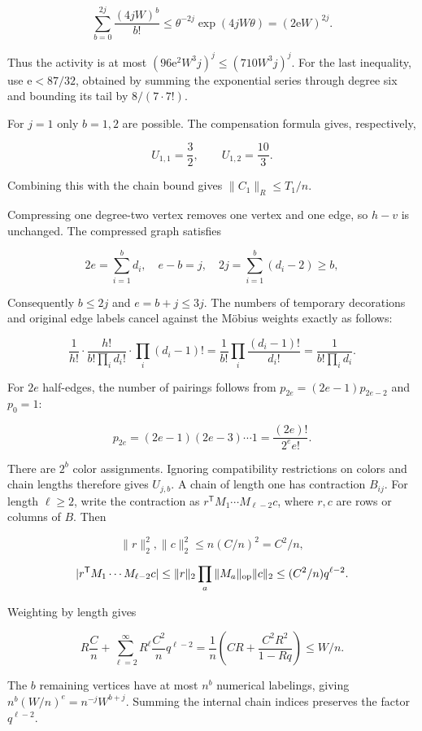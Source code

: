 \documentclass[11pt,a4paper]{article}
\begin{document}
\[
\sum_{b=0}^{2j}\frac{(4jW)^b}{b!}
\le\theta^{-2j}\exp(4jW\theta)
=(2\mathrm e W)^{2j}.
\]

Thus the activity is at most \((96\mathrm e^2W^3j)^j\le(710W^3j)^j\). For the last inequality, use \(\mathrm e<87/32\), obtained by summing the exponential series through degree six and bounding its tail by \(8/(7\cdot7!)\).

For \(j=1\) only \(b=1,2\) are possible. The compensation formula gives, respectively,

\[
U_{1,1}=\frac32,\qquad U_{1,2}=\frac{10}{3}.
\]

Combining this with the chain bound gives \(\|C_1\|_R\le T_1/n\).

Compressing one degree-two vertex removes one vertex and one edge, so \(h-v\) is unchanged. The compressed graph satisfies

\[
2e=\sum_{i=1}^bd_i,\quad e-b=j,\quad
2j=\sum_{i=1}^b(d_i-2)\ge b,
\]

Consequently \(b\le2j\) and \(e=b+j\le3j\). The numbers of temporary decorations and original edge labels cancel against the Möbius weights exactly as follows:

\[
\frac1{h!}\cdot\frac{h!}{b!\prod_i d_i!}\cdot\prod_i(d_i-1)!
=\frac1{b!}\prod_i\frac{(d_i-1)!}{d_i!}
=\frac1{b!\prod_i d_i}.
\]

For \(2e\) half-edges, the number of pairings follows from \(p_{2e}=(2e-1)p_{2e-2}\) and \(p_0=1\):

\[
p_{2e}=(2e-1)(2e-3)\cdots1=\frac{(2e)!}{2^ee!}.
\]

There are \(2^b\) color assignments. Ignoring compatibility restrictions on colors and chain lengths therefore gives \(U_{j,b}\). A chain of length one has contraction \(B_{ij}\). For length \(\ell\ge2\), write the contraction as \(r^{\mathsf T}M_1\cdots M_{\ell-2}c\), where \(r,c\) are rows or columns of \(B\). Then

\[
\|r\|_2^2,\|c\|_2^2\le n(C/n)^2=C^2/n,
\]

\[
|r^{\mathsf T}M_1\cdots M_{\ell-2}c|
\le\|r\|_2\prod_a\|M_a\|_{\rm op}\|c\|_2
\le(C^2/n)q^{\ell-2}.
\]

Weighting by length gives

\[
R\frac Cn+\sum_{\ell=2}^{\infty}R^\ell\frac{C^2}nq^{\ell-2}
=\frac1n\left(CR+\frac{C^2R^2}{1-Rq}\right)\le W/n.
\]

The \(b\) remaining vertices have at most \(n^b\) numerical labelings, giving \(n^b(W/n)^e=n^{-j}W^{b+j}\). Summing the internal chain indices preserves the factor \(q^{\ell-2}\).
\end{document}
